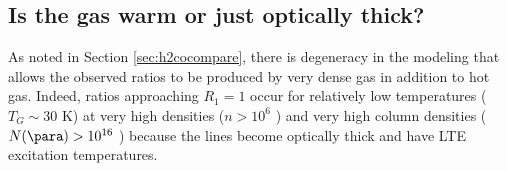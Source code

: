 % 
% 
% 

\subsection{Is the gas warm or just optically thick?}
\label{sec:thickorwarm}
As noted in Section \ref{sec:h2cocompare}, there is degeneracy in the modeling
that allows the observed ratios to be produced by very dense gas in addition to
hot gas.  Indeed, ratios approaching $R_1=1$ occur for relatively low
temperatures ($T_G\sim30$ K) at very high densities ($n>10^{6}$ \percc)
and very high column densities ($N(\para)>10^{16}$ \perkms \persc) because
the lines become optically thick and have LTE excitation temperatures.

